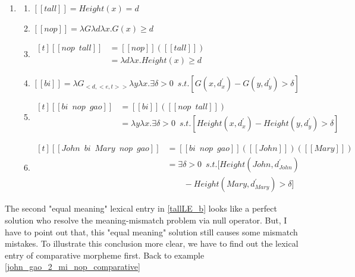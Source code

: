 \documentclass{ctexart}
\begin{document}
\begin{enumerate}[resume]
    \item \label{john_gao_2_mi_nop_comparative_LE}
    \begin{enumerate}[ref=(\arabic{enumi}\alph*)]
        \item $[\![tall]\!]=Height(x)=d$
        \item $[\![nop]\!]=\lambda G\lambda d \lambda x.G(x) \geq d$
        \item 
        $\begin{aligned}[t]
            [\![nop \enspace tall]\!] &= [\![nop]\!]([\![tall]\!]) \\
            &= \lambda d \lambda x.Height(x) \geq d
        \end{aligned}$ \label{john_gao_2_mi_nop_comparative_LE_bi}
        \item $[\![bi]\!]= \lambda G_{<d,<e,t>>} \lambda y \lambda x . \exists \delta > 0 \enspace s.t.[G(x,d_x^{\prime}) - G(y,d_y^{\prime})>\delta]$
        \item
        $\begin{aligned}[t]
            [\![bi \enspace nop \enspace gao]\!] &= [\![bi]\!]([\![nop \enspace tall]\!]) \\
            &= \lambda y \lambda x . \exists \delta > 0 \enspace s.t.[Height(x,d_x^{\prime}) - Height(y,d_y^{\prime})>\delta]
        \end{aligned}$
        \item
        $\begin{aligned}[t]
            [\![John \enspace bi \enspace Mary \enspace nop \enspace gao]\!] 
            &= [\![bi \enspace nop \enspace gao]\!]([\![John]\!])([\![Mary]\!]) \\
            &= \exists \delta > 0 \enspace s.t.[Height(John,d_{John}^{\prime}) \\ 
            & \qquad - Height(Mary,d_{Mary}^{\prime})>\delta]
        \end{aligned}$
    \end{enumerate}
\end{enumerate}

The second "equal meaning" lexical entry in \ref{tallLE_b} looks like a perfect solution who resolve the meaning-mismatch problem via null operator. But, I have to point out that, this "equal meaning" solution still causes some mismatch mistakes. To illustrate this conclusion more clear, we have to find out the lexical entry of comparative morpheme first. Back to example \ref{john_gao_2_mi_nop_comparative}
\end{document}
